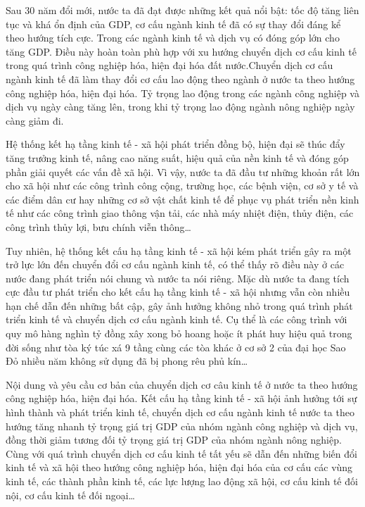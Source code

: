 Sau 30 năm đổi mới, nước ta đã đạt được những kết quả nổi bật: tốc độ tăng liên tục và khá ổn định của GDP, cơ cấu ngành kinh tế đã có sự thay đổi đáng kể theo hướng tích cực. Trong các ngành kinh tế và dịch vụ có đóng góp lớn cho tăng GDP. Điều này hoàn toàn phù hợp với xu hướng chuyển dịch cơ cấu kinh tế trong quá trình công nghiệp hóa, hiện đại hóa đất nước.Chuyển dịch cơ cấu ngành kinh tế đã làm thay đổi cơ cấu lao động theo ngành ở nước ta theo hướng công nghiệp hóa, hiện đại hóa. Tỷ trọng lao động trong các ngành công nghiệp và dịch vụ ngày càng tăng lên, trong khi tỷ trọng lao động ngành nông nghiệp ngày càng giảm đi.

Hệ thống kết hạ tầng kinh tế - xã hội phát triển đồng bộ, hiện đại sẽ thúc đẩy tăng trưởng kinh tế, nâng cao năng suất, hiệu quả của nền kinh tế và đóng góp phần giải quyết các vấn đề xã hội. Vì vậy, nước ta đã đầu tư những khoản rất lớn cho xã hội như các công trình công cộng, trường học, các bệnh viện, cơ sở y tế và các điểm dân cư hay những cơ sở vật chất kinh tế để phục vụ phát triển nền kinh tế như các công trình giao thông vận tải, các nhà máy nhiệt điện, thủy điện, các công trình thủy lợi, bưu chính viễn thông…

Tuy nhiên, hệ thống kết cấu hạ tầng kinh tế - xã hội kém phát triển gây ra một trở lực lớn đến chuyển đổi cơ cấu ngành kinh tế, có thể thấy rõ điều này ở các nước đang phát triển nói chung và nước ta nói riêng. Mặc dù nước ta đang tích cực đầu tư phát triển cho kết cấu hạ tầng kinh tế - xã hội nhưng vẫn còn nhiều hạn chế dẫn đến những bất cập, gây ảnh hưởng không nhỏ trong quá trình phát triển kinh tế và chuyển dịch cơ cấu ngành kinh tế. Cụ thể là các công trình với quy mô hàng nghìn tỷ đồng xây xong bỏ hoang hoặc ít phát huy hiệu quả trong đời sống như tòa ký túc xá 9 tầng cùng các tòa khác ở cơ sở 2 của đại học Sao Đỏ nhiều năm không sử dụng đã bị phong rêu phủ kín…

Nội dung và yêu cầu cơ bản của chuyển dịch cơ câu kinh tế ở nước ta theo hướng công nghiệp hóa, hiện đại hóa. Kết cấu hạ tầng kinh tế - xã hội ảnh hưởng tới sự hình thành và phát triển kinh tế, chuyển dịch cơ cấu ngành kinh tế nước ta theo hướng tăng nhanh tỷ trọng giá trị GDP của nhóm ngành công nghiệp và dịch vụ, đồng thời giảm tương đối tỷ trọng giá trị GDP của nhóm ngành nông nghiệp. Cùng với quá trình chuyển dịch cơ cấu  kinh tế tất yếu sẽ dẫn đến những biến đổi kinh tế và xã hội theo hướng công nghiệp hóa, hiện đại hóa của cơ cấu các vùng kinh tế, các thành phần kinh tế, các lực lượng lao động xã hội, cơ cấu kinh tế đối nội, cơ cấu kinh tế đối ngoại…

